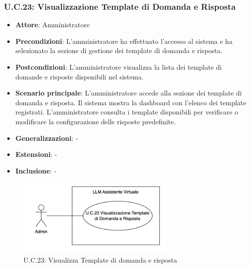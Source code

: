 \subsubsection{U.C.23: Visualizzazione Template di Domanda e Risposta}
\begin{itemize}
    \item \textbf{Attore}: Amministratore
    \item \textbf{Precondizioni}: L’amministratore ha effettuato l’accesso al sistema e ha selezionato la sezione di gestione dei template di domanda e risposta.
    \item \textbf{Postcondizioni}: L’amministratore visualizza la lista dei template di domande e risposte disponibili nel sistema.
    \item \textbf{Scenario principale}: L’amministratore accede alla sezione dei template di domanda e risposta. Il sistema mostra la dashboard con l’elenco dei template registrati. L’amministratore consulta i template disponibili per verificare o modificare la configurazione delle risposte predefinite.    
    \item \textbf{Generalizzazioni}: -
    \item \textbf{Estensioni}: -
    \item \textbf{Inclusione}: -
\end{itemize}
\begin{figure}[H]
    \centering
    \includegraphics[width=0.7\textwidth]{img/UC23.png}
    \caption{U.C.23: Visualizza Template di domanda e risposta}
\end{figure}
